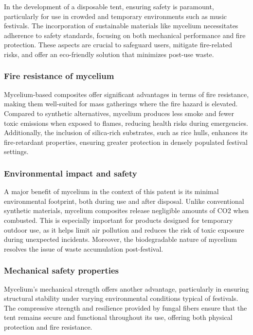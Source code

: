 \documentclass{article}
\begin{document}
In the development of a disposable tent, ensuring safety is paramount, particularly for
use in crowded and temporary environments such as music festivals. The incorporation of
sustainable materials like mycelium necessitates adherence to safety standards, focusing
on both mechanical performance and fire protection. These aspects are crucial to safeguard
users, mitigate fire-related risks, and offer an eco-friendly solution that minimizes
post-use waste.

\subsubsection{Fire resistance of mycelium}

Mycelium-based composites offer significant advantages in terms of fire resistance, making
them well-suited for mass gatherings where the fire hazard is elevated. Compared to
synthetic alternatives, mycelium produces less smoke and fewer toxic emissions when
exposed to flames, reducing health risks during emergencies. Additionally, the inclusion
of silica-rich substrates, such as rice hulls, enhances its fire-retardant properties,
ensuring greater protection in densely populated festival settings.\\


\subsubsection{Environmental impact and safety}

A major benefit of mycelium in the context of this patent is its minimal environmental
footprint, both during use and after disposal. Unlike conventional synthetic materials,
mycelium composites release negligible amounts of CO2 when combusted. This is especially
important for products designed for temporary outdoor use, as it helps limit air pollution
and reduces the risk of toxic exposure during unexpected incidents. Moreover, the
biodegradable nature of mycelium resolves the issue of waste accumulation post-festival.\\


\subsubsection{Mechanical safety properties}

Mycelium’s mechanical strength offers another advantage, particularly in ensuring
structural stability under varying environmental conditions typical of festivals. The
compressive strength and resilience provided by fungal fibers ensure that the tent remains
secure and functional throughout its use, offering both physical protection and fire
resistance.\\
\end{document}
